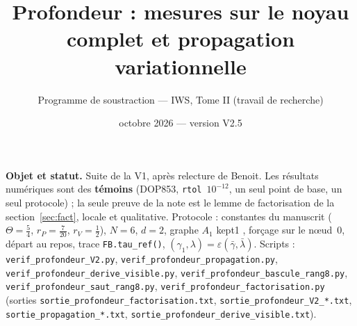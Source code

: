 \documentclass[11pt,a4paper]{article}
\title{Profondeur : mesures sur le noyau complet et propagation variationnelle}
\author{Programme de soustraction --- IWS, Tome II (travail de recherche)}
\date{octobre 2026 --- version V2.5}
\theoremstyle{remark}
\begin{document}
\maketitle

\noindent\textbf{Objet et statut.} Suite de la V1, apr\`es relecture de Benoit. Les r\'esultats num\'eriques sont des \textbf{t\'emoins} (DOP853, \texttt{rtol}~$10^{-12}$, un seul point de base, un seul protocole) ; la seule preuve de la note est le lemme de factorisation de la section~\ref{sec:fact}, locale et qualitative. Protocole : constantes du manuscrit ($\Theta=\frac54$, $r_P=\frac7{20}$, $r_V=\frac12$), $N=6$, $d=2$, graphe $A_1$ \og kept1 \fg, for\c{c}age sur le n\oe ud~0, d\'epart au repos, trace \texttt{FB.tau\_ref()}, $(\gamma_1,\lambda)=\varepsilon(\bar\gamma,\bar\lambda)$. Scripts : \texttt{verif\_profondeur\_V2.py}, \texttt{verif\_profondeur\_propagation.py}, \texttt{verif\_profondeur\_derive\_visible.py}, \texttt{verif\_profondeur\_bascule\_rang8.py}, \texttt{verif\_profondeur\_saut\_rang8.py}, \texttt{verif\_profondeur\_factorisation.py} (sorties \texttt{sortie\_profondeur\_factorisation.txt},  \texttt{sortie\_profondeur\_V2\_*.txt}, \texttt{sortie\_propagation\_*.txt}, \texttt{sortie\_profondeur\_derive\_visible.txt}).
\end{document}
